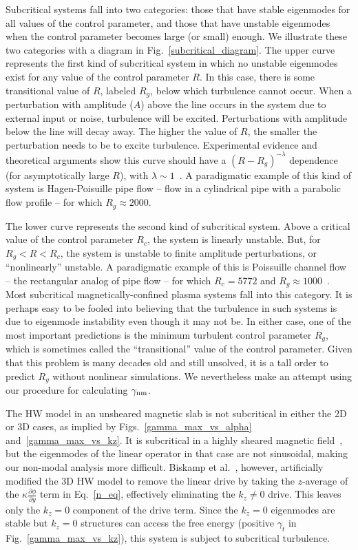 \documentclass[twocolumn,showkeys,superscriptaddress]{revtex4}
\newcommand{\pdiff}[2]{\frac{\partial#1}{\partial#2}}
\begin{document}
Subcritical systems fall into two categories: those that have stable eigenmodes for all values of the control parameter, and those that have unstable eigenmodes
when the control parameter becomes large (or small) enough. We illustrate these two categories with a diagram in Fig.~\ref{subcritical_diagram}. 
The upper curve represents the first kind of subcritical system in which no unstable eigenmodes exist for any value of the control parameter $R$. In this
case, there is some transitional value of $R$, labeled $R_g$, below
which turbulence cannot occur. When a perturbation with amplitude
($A$) above the line occurs in the system due to external input or noise, 
turbulence will be excited. Perturbations with amplitude below the line will decay away. The higher the value of $R$, the smaller the perturbation needs to be to excite turbulence.
Experimental evidence and theoretical arguments show this curve should have a $(R-R_g)^{-\lambda}$ dependence (for asymptotically large $R$), with $\lambda \sim 1$~\cite{waleffe1995b,grossmann2000,hof2003}.
A paradigmatic example of this kind of system is Hagen-Poisuille pipe flow -- flow in a cylindrical pipe with a parabolic flow profile -- for which $R_g \approx 2000$.

The lower curve represents the second kind of subcritical system. Above a critical value of the control parameter $R_c$, the system is linearly unstable. But, for $R_g < R < R_c$, the system is
unstable to finite amplitude perturbations, or ``nonlinearly'' unstable. A paradigmatic example of this is Poissuille channel flow -- the rectangular analog of pipe flow -- for which
$R_c = 5772$ and $R_g \approx 1000$~\cite{grossmann2000}. Most subcritical magnetically-confined plasma systems fall into this category. It is perhaps easy to be fooled into believing that the turbulence
in such systems is due to eigenmode instability even though it may not be. 
In either case, one of the most important predictions is the minimum turbulent control parameter $R_g$, which is sometimes called the ``transitional'' value of the control parameter. Given that this problem is many decades old
and still unsolved, it is a tall order to predict $R_g$ without nonlinear simulations. We nevertheless make an attempt using our procedure for calculating $\gamma_{\rm{nm}}$.

The HW model in an unsheared magnetic slab is not subcritical in either the 2D or 3D cases, as implied by Figs.~\ref{gamma_max_vs_alpha} and~\ref{gamma_max_vs_kz}. It is subcritical in a highly sheared
magnetic field~\cite{drake1995}, but the eigenmodes of the linear operator in that case are not sinusoidal, making our non-modal analysis more difficult. 
Biskamp et al.~\cite{biskamp1995}, however, artificially modified the
3D HW model to remove the linear drive by taking the $z$-average of the $\kappa \pdiff{\phi}{y}$ term in Eq.~\ref{n_eq}, effectively eliminating the $k_z \ne 0$ drive. This leaves only the $k_z = 0$
component of the drive term. Since the $k_z = 0$ eigenmodes are stable but $k_z = 0$ structures can access the free energy (positive $\gamma_t$ in Fig.~\ref{gamma_max_vs_kz}), this system is subject
to subcritical turbulence.
\end{document}
